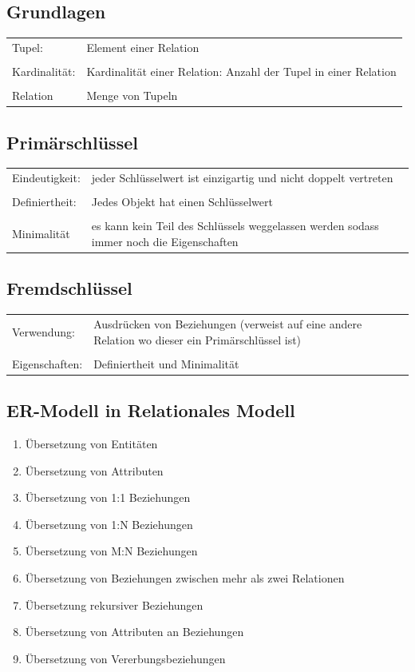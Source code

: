 \documentclass[a4paper]{article}
\begin{document}
\subsection{Grundlagen}
\begin{tabular}{l p{10cm}}
    Tupel: &  Element einer Relation \\
    & \\
    Kardinalität: & Kardinalität einer Relation: Anzahl der Tupel in einer Relation \\
    & \\
    Relation & Menge von Tupeln \\
\end{tabular}

\subsection{Primärschlüssel}
\begin{tabular}{l p{10cm}}
    Eindeutigkeit: &  jeder Schlüsselwert ist einzigartig und nicht doppelt vertreten \\
    & \\
    Definiertheit: & Jedes Objekt hat einen Schlüsselwert \\
    & \\
    Minimalität & es kann kein Teil des Schlüssels weggelassen werden sodass immer noch die Eigenschaften \\
\end{tabular}

\subsection{Fremdschlüssel}
\begin{tabular}{l p{10cm}}
    Verwendung: &  Ausdrücken von Beziehungen (verweist auf eine andere Relation wo dieser ein Primärschlüssel ist) \\
    & \\
    Eigenschaften: & Definiertheit und Minimalität
\end{tabular}

\subsection{ER-Modell in Relationales Modell}
\begin{enumerate}
    \item Übersetzung von Entitäten
    \item Übersetzung von Attributen
    \item Übersetzung von 1:1 Beziehungen
    \item Übersetzung von 1:N Beziehungen
    \item Übersetzung von M:N Beziehungen
    \item Übersetzung von Beziehungen zwischen mehr als zwei Relationen
    \item Übersetzung rekursiver Beziehungen
    \item Übersetzung von Attributen an Beziehungen
    \item Übersetzung von Vererbungsbeziehungen
\end{enumerate}
\end{document}
